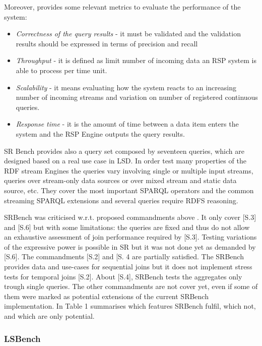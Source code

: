Moreover, \cite{Zhang2012} provides some relevant metrics to evaluate the performance of the system: 
\begin{itemize}
\item \textit{Correctness of the query results} - it must be validated and the validation results should be expressed in terms of precision and recall
\item \textit{Throughput} - it is defined as limit number of incoming data an RSP system is able to process per time unit.
\item \textit{Scalability} - it means evaluating how the system reacts to an increasing number of incoming streams and variation on number of registered continuous queries.
\item \textit{Response time} - it is the amount of time between a data item enters the system and the RSP Engine outputs the query results.
\end{itemize}

SR Bench provides also a query set composed by seventeen queries, which are designed based on a real use case in LSD. In order test many properties of the RDF stream Engines the queries vary involving single or multiple input streams, queries over stream-only data sources or over mixed stream and static data source, etc. They cover the most important SPARQL operators and the common streaming SPARQL extensions and several queries require RDFS reasoning.

SRBench was criticised w.r.t. proposed commandments above \cite{DBLP:conf/esws/ScharrenbachUMVB13}. It only cover [S.3] and [S.6] but with some limitations: the queries are fixed and thus do not allow an exhaustive assessment of join performance required by [S.3]. Testing variations of the expressive power is possible in SR but it was not done yet as demanded by [S.6]. The commandments [S.2] and [S.
4 are partially satisfied. The SRBench provides data and use-cases for sequential joins but it does not implement stress tests for temporal joins [S.2]. About [S.4], SRBench tests the aggregates only trough single queries. The other commandments are not cover yet, even if some of them were marked as potential extensions of the current SRBench implementation. In \cite{DBLP:conf/esws/ScharrenbachUMVB13} Table 1 summarises which features SRBench fulfil, which not, and which are only potential.

\subsubsection{LSBench}\label{sec:lsbench}

